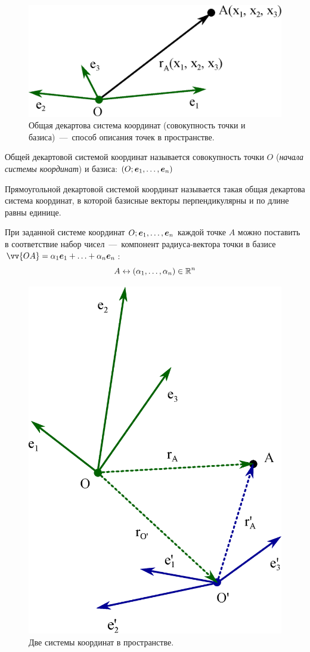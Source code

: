 \documentclass[a4paper,12pt]{article}
\begin{document}
  \begin{figure}[h]
    \centering
    
    \includegraphics[width=0.5\columnwidth]{coord-system}
    
    \caption{Общая декартова система координат (совокупность точки и базиса)~---~способ описания точек в пространстве.}
    \label{fig:coord-system}
  \end{figure}
  
  \begin{definition}
    Общей декартовой системой координат называется совокупность точки $O$ (\emph{начала системы координат}) и базиса: $(O; \boldsymbol e_1, \ldots, \boldsymbol e_n)$
  \end{definition}
  
  \begin{definition}
    Прямоугольной декартовой системой координат называется такая общая декартова система координат, в которой базисные векторы перпендикулярны и по длине равны единице.
  \end{definition}
  
  \begin{remark}
    При заданной системе координат $O; \boldsymbol e_1, \ldots, \boldsymbol e_n$ каждой точке $A$ можно поставить в соответствие набор чисел~---~компонент радиуса-вектора точки в базисе $\vv{OA} \hm= \alpha_1 \bds e_1 \hm+ \ldots \hm+ \alpha_n \bds e_n$:
    \[
      A \leftrightarrow (\alpha_1, \ldots, \alpha_n) \in \operatorname{\mathbb R}^n
    \]
  \end{remark}

  \begin{figure}[H]
    \centering
    
    \includegraphics[width=0.5\columnwidth]{two-coords}
    
    \caption{Две системы координат в пространстве.}
    \label{fig:two-coords}
  \end{figure}
\end{document}
